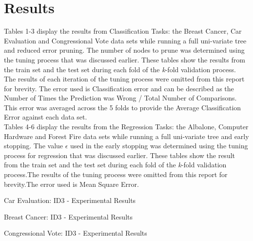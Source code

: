 \documentclass[twoside,11pt]{article}
\begin{document}
\newpage

\section{Results}
Tables 1-3 display the results from Classification Tasks: the Breast Cancer, Car Evaluation and Congressional Vote data sets while running a full uni-variate tree and reduced error pruning. The number of nodes to prune was determined using the tuning process that was discussed earlier. These tables show the results from the train set and the test set during each fold of the \textit{k}-fold validation process. The results of each iteration of the tuning process were omitted from this report for brevity. The error used is Classification error and can be described as the Number of Times the Prediction was Wrong / Total Number of Comparisons. This error was averaged across the 5 folds to provide the Average Classification Error against each data set.\\
Tables 4-6 display the results from the Regression Tasks: the Albalone, Computer Hardware and Forest Fire data sets while running a full uni-variate tree and early stopping. The value $\epsilon$ used in the early stopping was determined using the tuning process for regression that was discussed earlier. These tables show the result from the train set and the test set during each fold of the \textit{k}-fold validation process.The results of the tuning process were omitted from this report for brevity.The error used is  Mean Square Error.\newline

\begin{table}[h]
		\centering
		\caption{Car Evaluation: ID3 - Experimental Results}
		\label{tab:table1}
\end{table}

\begin{table}[h]
		\centering
		\caption{Breast Cancer: ID3 - Experimental Results}
		\label{tab:table2}
\end{table}
\newpage

\begin{table}[h]
		\centering
		\caption{Congressional Vote: ID3 - Experimental Results}
		\label{tab:table3}
\end{table}
\end{document}
